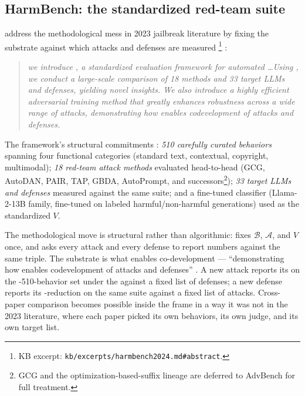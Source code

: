 \subsection{HarmBench: the standardized red-team suite}
\label{sec:safety-harmbench}

\citet{harmbench2024} address the methodological mess in 2023
jailbreak literature by fixing the substrate against which attacks
and defenses are measured%
\footnote{KB excerpt: \texttt{kb/excerpts/harmbench2024.md\#abstract}.}
\citep[\S{}abstract]{harmbench2024}:

\begin{quote}\itshape
we introduce , a standardized evaluation framework for
automated \ldots Using , we conduct a
large-scale comparison of 18  methods and 33 target
LLMs and defenses, yielding novel insights. We also introduce a
highly efficient adversarial training method that greatly enhances
 robustness across a wide range of attacks, demonstrating how
 enables codevelopment of attacks and defenses.
\end{quote}

The framework's structural commitments
\citep[\S{}sec-structure]{harmbench2024}: \emph{510 carefully
curated behaviors} spanning four functional categories (standard
text, contextual, copyright, multimodal); \emph{18 red-team attack
methods} evaluated head-to-head (GCG, AutoDAN, PAIR, TAP, GBDA,
AutoPrompt, and successors\footnote{GCG and the
optimization-based-suffix lineage are deferred to AdvBench
 for full
treatment.}); \emph{33 target LLMs and defenses} measured against
the same suite; and a fine-tuned \emph{} classifier
(Llama-2-13B family, fine-tuned on labeled harmful/non-harmful
generations) used as the standardized $V$.

The methodological move is structural rather than algorithmic:
 fixes $\mathcal{B}$, $\mathcal{A}$, and $V$ once, and
asks every attack and every defense to report numbers against the
same triple. The substrate is what enables co-development ---
``demonstrating how  enables codevelopment of attacks and
defenses''
\citep[\S{}abstract]{harmbench2024}. A new attack reports its
 on the -510-behavior set under the
 against a fixed list of defenses; a new defense
reports its -reduction on the same suite against a fixed list
of attacks. Cross-paper comparison becomes possible inside the
 frame in a way it was not in the 2023 literature, where
each paper picked its own behaviors, its own judge, and its own
target list.

